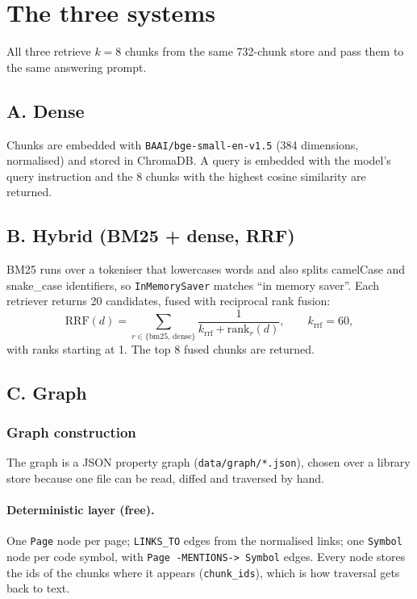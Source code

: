 \documentclass[11pt,a4paper]{article}
\newcommand{\code}[1]{\texttt{#1}}
\begin{document}
\section{The three systems}

All three retrieve $k=8$ chunks from the same 732-chunk store and pass them to the same answering
prompt.

\subsection{A. Dense}

Chunks are embedded with \code{BAAI/bge-small-en-v1.5} (384 dimensions, normalised) and stored
in ChromaDB. A query is embedded with the model's query instruction and the 8 chunks with the
highest cosine similarity are returned.

\subsection{B. Hybrid (BM25 + dense, RRF)}

BM25 runs over a tokeniser that lowercases words and also splits camelCase and snake\_case
identifiers, so \code{InMemorySaver} matches ``in memory saver''. Each retriever returns 20
candidates, fused with reciprocal rank fusion:
\[
  \mathrm{RRF}(d) = \sum_{r \in \{\text{bm25},\,\text{dense}\}} \frac{1}{k_{\text{rrf}} + \mathrm{rank}_r(d)},
  \qquad k_{\text{rrf}} = 60,
\]
with ranks starting at 1. The top 8 fused chunks are returned.

\subsection{C. Graph}

\subsubsection{Graph construction}

The graph is a JSON property graph (\code{data/graph/*.json}), chosen over a library store
because one file can be read, diffed and traversed by hand.

\paragraph{Deterministic layer (free).} One \code{Page} node per page; \code{LINKS\_TO} edges from
the normalised links; one \code{Symbol} node per code symbol, with \code{Page -MENTIONS-> Symbol}
edges. Every node stores the ids of the chunks where it appears (\code{chunk\_ids}), which is how
traversal gets back to text.
\end{document}
